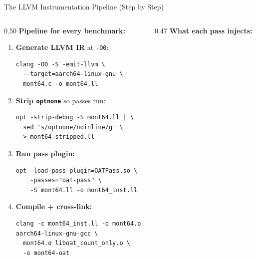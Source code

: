 \documentclass[aspectratio=169, 10pt]{beamer}
\begin{document}
\begin{frame}[fragile]{The LLVM Instrumentation Pipeline (Step by Step)}
    \begin{columns}[T]
        \begin{column}{0.50\textwidth}
            \textbf{\scriptsize Pipeline for every benchmark:}
            \vspace{1pt}
            \begin{enumerate}\scriptsize
                \item \textbf{Generate LLVM IR} at \texttt{-O0}:
                      \begin{lstlisting}[style=bashstyle]
clang -O0 -S -emit-llvm \
  --target=aarch64-linux-gnu \
  mont64.c -o mont64.ll
                      \end{lstlisting}
                \item \textbf{Strip \texttt{optnone}} so passes run:
                      \begin{lstlisting}[style=bashstyle]
opt -strip-debug -S mont64.ll | \
  sed 's/optnone/noinline/g' \
  > mont64_stripped.ll
                      \end{lstlisting}
                \item \textbf{Run pass plugin:}
                      \begin{lstlisting}[style=bashstyle]
opt -load-pass-plugin=OATPass.so \
    -passes="oat-pass" \
    -S mont64.ll -o mont64_inst.ll
                      \end{lstlisting}
                \item \textbf{Compile + cross-link:}
                      \begin{lstlisting}[style=bashstyle]
clang -c mont64_inst.ll -o mont64.o
aarch64-linux-gnu-gcc \
  mont64.o liboat_count_only.o \
  -o mont64-oat
                      \end{lstlisting}
            \end{enumerate}
        \end{column}
        \begin{column}{0.47\textwidth}
            \textbf{\scriptsize What each pass injects:}
            \vspace{2pt}


\end{column}
\end{columns}
\end{frame}
\end{document}
